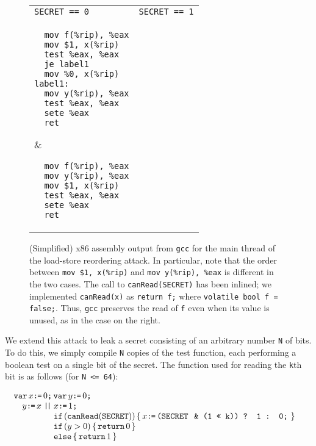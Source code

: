 \begin{figure}
  \begin{tabular}[fragile]{p{3cm} | p{3cm}}
    \texttt{SECRET == 0} & \texttt{SECRET == 1} \\
\begin{verbatim}
  mov f(%rip), %eax
  mov $1, x(%rip)
  test %eax, %eax
  je label1
  mov %0, x(%rip)
label1:
  mov y(%rip), %eax
  test %eax, %eax
  sete %eax
  ret
\end{verbatim}
  &
\begin{verbatim}
  mov f(%rip), %eax
  mov y(%rip), %eax
  mov $1, x(%rip)
  test %eax, %eax
  sete %eax
  ret
\end{verbatim}
  \\
  \end{tabular}
  \caption{
    (Simplified) x86 assembly output from \texttt{gcc} for the main thread of
    the load-store reordering attack.
    In particular, note that the order between \texttt{mov \$1, x(\%rip)}
    and \texttt{mov y(\%rip), \%eax} is different in the two cases.
    The call to \texttt{canRead(SECRET)} has been inlined; we implemented
    \texttt{canRead(x)} as \texttt{return f;} where
    \texttt{volatile bool f = false;}.
    Thus, \texttt{gcc} preserves the read of \texttt{f} even when its value is
    unused, as in the case on the right.
  }
  \label{fig:lsr-asm}
\end{figure}

We extend this attack to leak a secret consisting of an arbitrary number
\verb|N| of bits.
To do this, we simply compile \verb|N| copies of the test function, each
performing a boolean test on a single bit of the secret.
The function used for reading the \verb|k|th bit is as follows (for
\verb|N <= 64|):

\[\begin{array}[t]{@{}l}
  \VAR x\GETS0\SEMI \VAR y\GETS0\SEMI\\\quad
    y\GETS x
  \PAR\begin{array}[t]{@{}l}
    x\GETS 1\SEMI\\
    \IF(\CANREAD(\SEC))\THEN x\GETS\texttt{(\SEC\, \& (1 << k)) ? 1 : 0}\SEMI\FI\\
    \IF(y > 0)\THEN \RETURN 0
    \brELSE \RETURN 1\FI
\end{array}\end{array}\]


